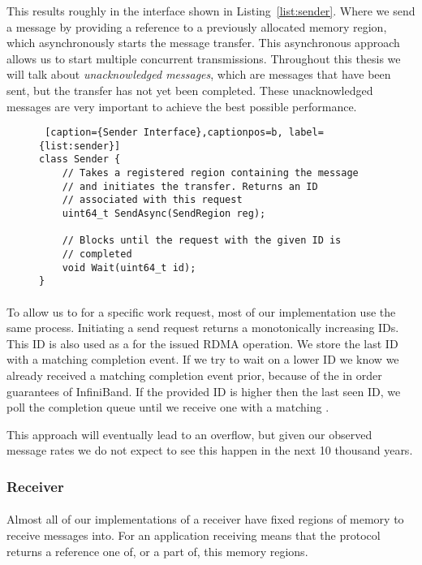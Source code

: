 This results roughly in the interface shown in Listing~\ref{list:sender}. Where we send a message by providing a reference
to a previously allocated memory region, which asynchronously starts the message transfer. This asynchronous approach allows
us to start multiple concurrent transmissions. Throughout this thesis we will talk about \emph{unacknowledged messages}, which
are messages that have been sent, but the transfer has not yet been completed. These unacknowledged messages are very 
important to achieve the best possible performance.

\begin{figure}[htp]
\begin{lstlisting} [caption={Sender Interface},captionpos=b, label={list:sender}] 
class Sender {
    // Takes a registered region containing the message
    // and initiates the transfer. Returns an ID 
    // associated with this request
    uint64_t SendAsync(SendRegion reg);

    // Blocks until the request with the given ID is
    // completed
    void Wait(uint64_t id);
}
\end{lstlisting}
\end{figure}

\paragraph{} To allow us to  for a specific work request, most of our implementation use the same process. 
Initiating a send request returns a monotonically increasing IDs. This ID is also used as a  for the issued RDMA
operation. We store the last ID with a matching completion event. If we try to wait on a lower ID we know we already received 
a matching completion event prior, because of the in order guarantees of InfiniBand. If the provided ID is higher then the
last seen ID, we poll the completion queue until we receive one with a matching .

This approach will eventually lead to an overflow, but given our observed  message rates we do not expect to see this 
happen in the next 10 thousand years. 

\subsubsection{Receiver}

\paragraph{} Almost all of our implementations of a receiver have fixed regions of memory to receive messages into. 
For an application receiving means that the protocol returns a reference one of, or a part of, this memory regions. 

